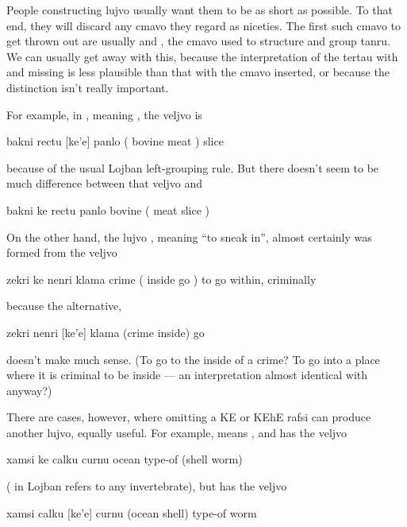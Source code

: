 People constructing lujvo usually want them to be as short
    as possible. To that end, they will discard any cmavo they
    regard as niceties. The first such cmavo to get thrown out are
    usually  and , the cmavo used to structure and
    group tanru. We can usually get away with this, because the
    interpretation of the tertau with  and  missing
    is less plausible than that with the cmavo inserted, or because
    the distinction isn't really important.

For example, in , meaning , the
    veljvo is
\begin{example}
 bakni rectu [ke'e] panlo\n
( bovine meat ) slice
\end{example}

{\noindent}because of the usual Lojban left-grouping rule. But there
    doesn't seem to be much difference between that veljvo and
\begin{example}
bakni ke rectu panlo \n
bovine ( meat slice )
\end{example}

On the other hand, the lujvo , meaning ``to sneak
    in'', almost certainly was formed from the veljvo
\begin{example}
zekri ke nenri klama \n
crime ( inside go )\n
to go within, criminally
\end{example}

{\noindent}because the alternative,
\begin{example}
[ke] zekri nenri [ke'e] klama\n
(crime inside) go
\end{example}

{\noindent}doesn't make much sense. (To go to the inside of a crime? To go
    into a place where it is criminal to be inside --- an
    interpretation almost identical with  anyway?) 

There are cases, however, where omitting a KE or KEhE rafsi
    can produce another lujvo, equally useful. For example,
     means , and has the
    veljvo
\begin{example}
xamsi ke calku curnu\n
ocean type-of (shell worm)
\end{example}

( in Lojban refers to any invertebrate), but
     has the veljvo
\begin{example}
 xamsi calku [ke'e] curnu\n
(ocean shell) type-of worm
\end{example}

